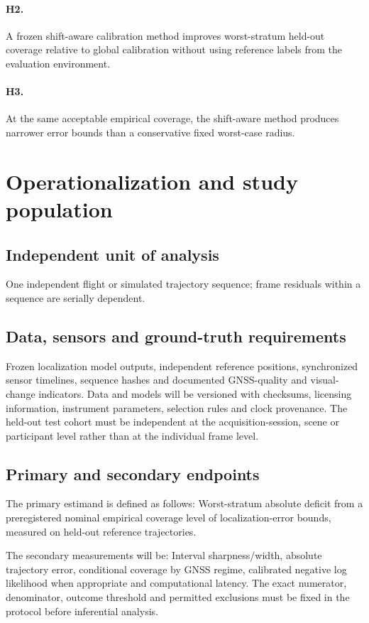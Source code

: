 \documentclass[11pt,a4paper]{article}
\begin{document}
\paragraph{H2.} A frozen shift-aware calibration method improves worst-stratum held-out coverage relative to global calibration without using reference labels from the evaluation environment.

\paragraph{H3.} At the same acceptable empirical coverage, the shift-aware method produces narrower error bounds than a conservative fixed worst-case radius.

\section{Operationalization and study population}
\subsection{Independent unit of analysis}
One independent flight or simulated trajectory sequence; frame residuals within a sequence are serially dependent.

\subsection{Data, sensors and ground-truth requirements}
Frozen localization model outputs, independent reference positions, synchronized sensor timelines, sequence hashes and documented GNSS-quality and visual-change indicators. Data and models will be versioned with checksums, licensing information, instrument parameters, selection rules and clock provenance. The held-out test cohort must be independent at the acquisition-session, scene or participant level rather than at the individual frame level.

\subsection{Primary and secondary endpoints}
The primary estimand is defined as follows: Worst-stratum absolute deficit from a preregistered nominal empirical coverage level of localization-error bounds, measured on held-out reference trajectories.

The secondary measurements will be: Interval sharpness/width, absolute trajectory error, conditional coverage by GNSS regime, calibrated negative log likelihood when appropriate and computational latency. The exact numerator, denominator, outcome threshold and permitted exclusions must be fixed in the protocol before inferential analysis.
\end{document}
